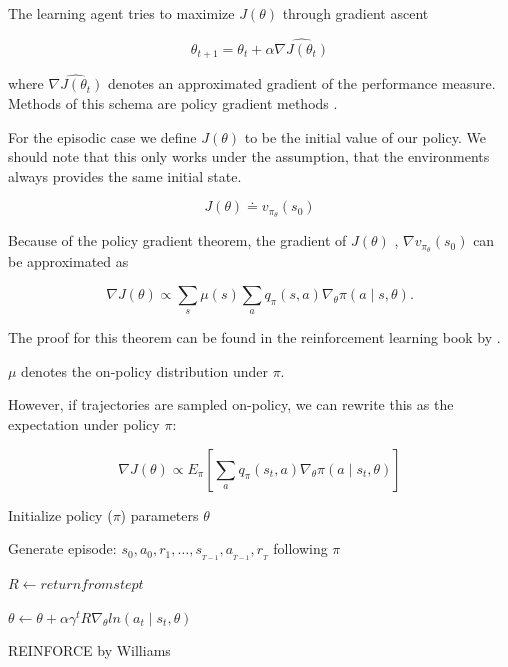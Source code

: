 The learning agent tries to maximize $J(\theta)$ through gradient ascent

\begin{equation}
\theta_{t+1} = \theta_t + \alpha \widehat{\nabla J(\theta_t)}
\end{equation}

where $\widehat{\nabla J(\theta_t)}$ denotes an approximated gradient of the performance measure.
Methods of this schema are policy gradient methods \citep{Sut98}. 

For the episodic case we define $J(\theta)$ to be the initial value of our policy. We should note that this only works under the assumption, that the environments always provides the same initial state.

\begin{equation}
J(\theta) \doteq v_{\pi_\theta}(s_0)
\end{equation}

Because of the policy gradient theorem, the gradient of $J(\theta)$ , $ \nabla v_{\pi_\theta}(s_0)$ can be approximated as

\begin{equation}
\nabla J(\theta) \propto \sum_s \mu (s) \sum_a q_\pi (s,a) \nabla_\theta \pi(a \mid s, \theta).
\end{equation}

The proof for this theorem can be found in the reinforcement learning book by \citet{Sut98}.

$\mu$ denotes the on-policy distribution under $\pi$.

However, if trajectories are sampled on-policy, we can rewrite this as the expectation under policy $\pi$:

\begin{equation}
\nabla J(\theta) \propto E_\pi \left[ \sum_a q_\pi (s_t,a) \nabla_\theta \pi (a \mid s_t, \theta) \right]
\end{equation}


\begin{algorithm}[h]

 Initialize policy ($\pi$) parameters $\theta$ 
 
 { 
 Generate episode: $s_0, a_0, r_1, \dots,s_{_{T-1}},   a_{_{T-1}}, r_{_T}$ following $\pi$ 
 
 {
 $R \gets return from step t$
 
 $\theta \gets \theta + \alpha \gamma^t R\nabla_\theta ln(a_t \mid s_t, \theta)$
 }

 }

 \caption{REINFORCE by Williams \citep{Sut98}}
\end{algorithm}



